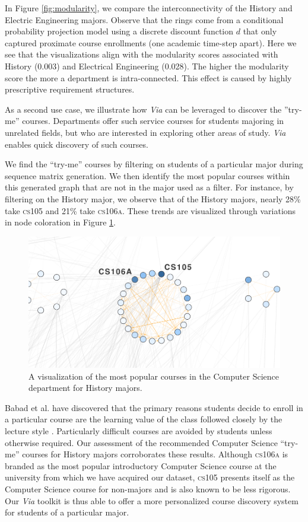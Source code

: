 \documentclass{sigchi}
\begin{document}
In Figure \ref{fig:modularity}, we compare the interconnectivity of
the History and Electric Engineering majors.  Observe that the rings
come from a conditional probability projection model using a discrete
discount function $d$ that only captured proximate course enrollments
(one academic time-step apart). Here we see that the visualizations
align with the modularity scores associated with History (0.003) and
Electrical Engineering (0.028). The higher the modularity score the
more a department is intra-connected. This effect is caused by highly
prescriptive requirement structures.

As a second use case, we illustrate how \textit{Via} can be leveraged
to discover the ''try-me'' courses. Departments offer such service courses for students
majoring in unrelated fields, but who are interested in exploring other
areas of study. {\em Via} enables quick discovery of such courses.

We find the ``try-me'' courses by filtering on students of a
particular major during sequence matrix generation. We then identify
the most popular courses within this generated graph that are not in
the major used as a filter. For instance, by filtering on the History
major, we observe that of the History majors, nearly 28\% take \textsc{cs105}
and 21\% take \textsc{cs106a}. These trends are visualized through variations
in node coloration in Figure \ref{fig:history-try-me}.

\begin{figure}[h]
    \centering
    \includegraphics[width=.9\columnwidth]{final-history-try-me.pdf}
    \caption{A visualization of the most popular courses in the Computer Science department for History majors.}
    \label{fig:history-try-me}
\end{figure}

 Babad et al. have discovered that the primary reasons students decide to enroll in a particular course are the learning value of the class followed closely by the lecture style \cite{Babad2003}. Particularly difficult courses are avoided by students unless otherwise required. Our assessment of the recommended Computer Science ``try-me'' courses for History majors corroborates these results. Although \textsc{cs106a} is branded as the most popular introductory Computer Science course at the university from which we have acquired our dataset, \textsc{cs105} presents itself as the Computer Science course for non-majors and is also known to be less rigorous. Our \textit{Via} toolkit is thus able to offer a more personalized course discovery system for students of a particular major. 
 
\end{document}
